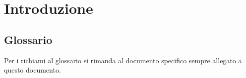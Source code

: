 \chapter{Introduzione}

\section{Glossario}

Per i richiami al glossario si rimanda al documento specifico sempre allegato a questo documento.
